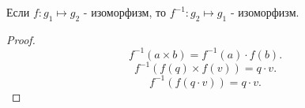 \documentclass[11pt, oneside]{article}   	%
\begin{document}
        \begin{theorem}
            Если $f: g_1 \mapsto g_2$ - изоморфизм, то $f^{-1}: g_2 \mapsto g_1$ - изоморфизм.\\
            \begin{proof}
                \[ f^{-1}(a\times b) = f^{-1}(a)\cdot f(b) .\]
                \[ f^{-1}(f(q)\times  f(v)) = q \cdot v .\]
                \[ f^{-1}(f(q\cdot v)) = q\cdot v .\] 
            \end{proof}
        \end{theorem}
\end{document}
